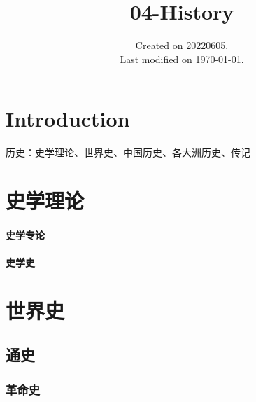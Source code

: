 \documentclass[UTF8]{../RepresentationUniverse}
\begin{document}
\title{04-History}
\date{Created on 20220605.\\   Last modified on \today.}
\maketitle
\tableofcontents


\chapter{Introduction}

历史：史学理论、世界史、中国历史、各大洲历史、传记


\chapter{史学理论}

\subsubsection{史学专论}
\subsubsection{史学史}








\chapter{世界史}
\section{通史}
    \subsection{革命史}
\end{document}

